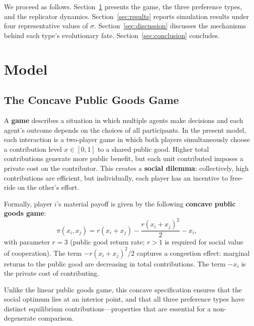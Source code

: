 \documentclass[12pt]{article}
\begin{document}
We proceed as follows. Section~\ref{sec:model} presents the game, the three preference types, and the replicator dynamics. Section~\ref{sec:results} reports simulation results under four representative values of $\sigma$. Section~\ref{sec:discussion} discusses the mechanisms behind each type's evolutionary fate. Section~\ref{sec:conclusion} concludes.

\section{Model}\label{sec:model}

\subsection{The Concave Public Goods Game}

A \textbf{game} describes a situation in which multiple agents make decisions and each agent's outcome depends on the choices of all participants. In the present model, each interaction is a two-player game in which both players simultaneously choose a contribution level $x \in [0,1]$ to a shared public good. Higher total contributions generate more public benefit, but each unit contributed imposes a private cost on the contributor. This creates a \textbf{social dilemma}: collectively, high contributions are efficient, but individually, each player has an incentive to free-ride on the other's effort.

Formally, player $i$'s material payoff is given by the following \textbf{concave public goods game}:
\begin{equation}
    \pi(x_i, x_j) = r(x_i + x_j) - \frac{r(x_i + x_j)^2}{2} - x_i,
    \label{eq:pgg}
\end{equation}
with parameter $r = 3$ (public good return rate; $r > 1$ is required for social value of cooperation). The term $-r(x_i+x_j)^2/2$ captures a congestion effect: marginal returns to the public good are decreasing in total contributions. The term $-x_i$ is the private cost of contributing.

Unlike the linear public goods game, this concave specification ensures that the social optimum lies at an interior point, and that all three preference types have distinct equilibrium contributions---properties that are essential for a non-degenerate comparison.
\end{document}
